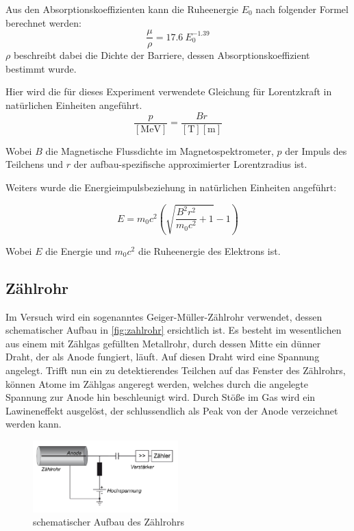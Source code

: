 \documentclass[12pt,english,ngerman]{scrartcl}
\begin{document}
Aus den Absorptionskoeffizienten kann die Ruheenergie \(E_0\) nach folgender
Formel berechnet werden:
\begin{equation}
	\frac{\mu}{\rho} = 17.6 \ E_0^{-1.39}
	\label{eq:Endpunktsenergie}
\end{equation}
\(\rho\) beschreibt dabei die Dichte der Barriere, dessen
Absorptionskoeffizient bestimmt wurde.~\cite[]{}

Hier wird die für dieses Experiment verwendete Gleichung für Lorentzkraft in
natürlichen Einheiten angeführt.
\begin{equation}
	\frac{p}{[\si{\mega\electronvolt}]} =  \frac{Br}{[\si{\tesla}][\si{\meter}]}
	\label{eq:lorentzimpuls}
\end{equation}

Wobei $B$ die Magnetische Flussdichte im Magnetospektrometer, $p$ der Impuls
des Teilchens und $r$ der aufbau-spezifische approximierter Lorentzradius ist.

Weiters wurde die Energieimpulsbeziehung in natürlichen Einheiten angeführt:

\begin{equation}
	E = m_0 c^2 \left(\sqrt{\frac{ B^{2} r^{2}}{m_0 c^2} + 1} - 1 \right)
	\label{eq:energieimpulsrelation}
\end{equation}

Wobei $E$ die Energie und $m_0 c^2$ die Ruheenergie des Elektrons ist.

\subsection{Zählrohr}

Im Versuch wird ein sogenanntes Geiger-Müller-Zählrohr verwendet, dessen
schematischer Aufbau in \autoref{fig:zahlrohr} ersichtlich ist. Es besteht im
wesentlichen aus einem mit Zählgas gefüllten Metallrohr, durch dessen Mitte ein
dünner Draht, der als Anode fungiert, läuft. Auf diesen Draht wird eine
Spannung angelegt. Trifft nun ein zu detektierendes Teilchen auf das Fenster
des Zählrohrs, können Atome im Zählgas angeregt werden, welches durch die
angelegte Spannung zur Anode hin beschleunigt wird. Durch Stöße im Gas wird ein
Lawineneffekt ausgelöst, der schlussendlich als Peak von der Anode verzeichnet
werden kann.

\begin{figure}[H]
	\begin{center}
		\includegraphics[width = 0.5\textwidth]{./figures/zahlrohr.png}

	\end{center}
	\caption{schematischer Aufbau des Zählrohrs~\cite[]{}}
	\label{fig:zahlrohr}
\end{figure}
\end{document}
